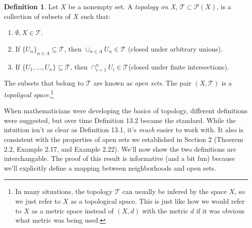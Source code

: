 \documentclass{article}
\theoremstyle{definition}
\newtheorem{definition}{Definition}[section]
\begin{document}
	\begin{definition}\label{def}
		Let $X$ be a nonempty set. A \textit{\color{red}topology on X}, $\mathcal T \subset \mathcal P(X)$, is a collection of subsets of $X$ such that:
		\begin{enumerate}
			\item $\emptyset, X\in \mathcal T$.
			\item If $\{U_\alpha\}_{\alpha \in A}\subseteq \mathcal T$, then $\cup_{\alpha \in A}U_\alpha \in \mathcal T$ (closed under arbitrary unions).
			\item If $\{U_1,\ldots,U_n\} \subseteq \mathcal T$, then $ \cap_{i=1}^n U_i \in \mathcal T$(closed under finite intersections).
		\end{enumerate}
	The subsets that belong to $\mathcal T$ are known as \textit{\color{red}open sets}. The pair $(X,\mathcal{T})$ is a \textit{\color{red}topoligcal space}.\footnote{In many situations, the topology $\mathcal T$ can usually be infered by the space $X$, so we just refer to $X$ as a topological space. This is just like how we would refer to $X$ as a metric space instead of $(X,d)$ with the metric $d$ if it was obvious what metric was being used.} 
	\end{definition}

	When mathematicians were developing the basics of topology, different definitions were suggested, but over time Definition 13.2 became the standard. While the intuition isn't as clear as Definition 13.1, it's \textit{much} easier to work with.  It also is consistent with the properties of open sets we established in Section 2 (Thoerem 2.2, Example 2.17, and Example 2.22). We'll now show the two definitions are interchangable. The proof of this result is informative (and a bit fun) because we'll explicitly define a mapping between neighborhoods and open sets.
\end{document}
